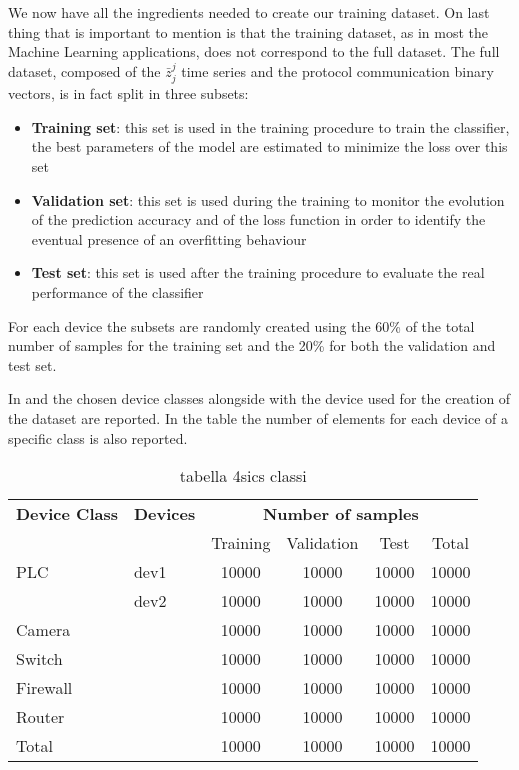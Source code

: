 We now have all the ingredients needed to create our training dataset. On last thing that is important to mention is that the training dataset, as in most the Machine Learning applications,
does not correspond to the full dataset. The full dataset, composed of the $\bar{z}_j^j$ time series and the protocol communication binary vectors, is in fact split in three subsets:
\begin{itemize}
    \item \textbf{Training set}: this set is used in the training procedure to train the classifier, the best parameters of the model are estimated to minimize the loss over this set
    \item \textbf{Validation set}: this set is used during the training to monitor the evolution of the prediction accuracy and of the loss function in order to identify the eventual presence of an overfitting behaviour 
    \item \textbf{Test set}: this set is used after the training procedure to evaluate the real performance of the classifier
\end{itemize}

For each device the subsets are randomly created using the 60\% of the total number of samples for the training set and the 20\% for both the validation and test set.

In  and  the chosen device classes alongside with the device used for the creation of the dataset are reported. In the table the number of elements for each device of a specific class is also reported.




\begin{table}
\centering
\begin{tabular}{llcccc}
\toprule
\textbf{Device Class} & \textbf{Devices} & \multicolumn{4}{c}{\textbf{Number of samples}} \\
& & Training & Validation & Test & Total \\
\midrule
\multirow{1}{*}{PLC}      & dev1& 10000 & 10000 & 10000 & 10000  \\
                         & dev2 & 10000 & 10000 & 10000 & 10000  \\
\midrule
\multirow{1}{*}{Camera}  & & 10000 & 10000 & 10000 & 10000 \\
\midrule
\multirow{1}{*}{Switch} & & 10000 & 10000 & 10000 & 10000 \\
\midrule
\multirow{1}{*}{Firewall}& & 10000 & 10000 & 10000 & 10000 \\
\midrule
\multirow{1}{*}{Router} &  &10000 & 10000 & 10000 & 10000  \\
\midrule
\midrule
Total & & 10000 & 10000 & 10000 & 10000 \\
\bottomrule
\end{tabular}
\caption{tabella 4sics classi}
\label{tab:4sicsdev}
\end{table}


